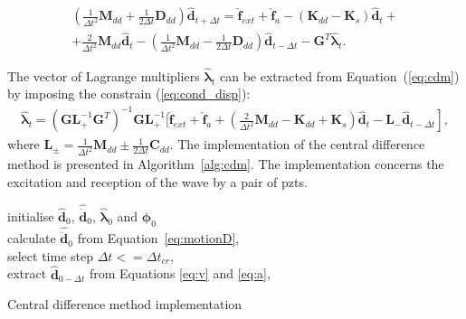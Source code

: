 \begin{equation}
	\begin{array}{c}
		\left(\frac{1}{\Delta t^2}\textbf{M}_{dd}+\frac{1}{2\Delta t}\textbf{D}_{dd} \right)\widehat{\textbf{d}}_{t+\Delta t}=
		\widehat{\textbf{f}}_{ext} + \widehat{\textbf{f}}_{a} - \left( \textbf{K}_{dd}-\textbf{K}_s\right)\widehat{\textbf{d}}_t+\\
		+\frac{2}{\Delta t^2}\textbf{M}_{dd}\widehat{\textbf{d}}_t-\left(\frac{1}{\Delta t^2}\textbf{M}_{dd}-\frac{1}{2\Delta t}\textbf{D}_{dd}\right)\widehat{\textbf{d}}_{t-\Delta t}-\textbf{G}^T\widehat{\boldsymbol{\lambda}}_t.
	\end{array}
	\label{eq:cdm}
\end{equation}

The vector of Lagrange multipliers \(\widehat{\boldsymbol{\lambda}}_t\) can be extracted from Equation~(\ref{eq:cdm}) by imposing the constrain (\ref{eq:cond_disp}): 
\begin{eqnarray}
	\widehat{\boldsymbol{\lambda}}_t = {\left(\textbf{G}\textbf{L}_+^{-1}\textbf{G}^T \right)}^{-1}\textbf{G}\textbf{L}_+^{-1} \Bigg[ \widehat{\textbf{f}}_{ext} + \widehat{\textbf{f}}_{a} + \left.\left(\frac{2}{\Delta t^2}\textbf{M}_{dd}-\textbf{K}_{dd}+\textbf{K}_s\right)\widehat{\textbf{d}}_t -\textbf{L}_-\widehat{\textbf{d}}_{t-\Delta t} \right],
	\label{eq:lambda}
\end{eqnarray}
where \(\textbf{L}_{\pm}=\frac{1}{\Delta t^2}\textbf{M}_{dd}\pm\frac{1}{2\Delta t}\textbf{C}_{dd}\).
The implementation of the central difference method is presented in Algorithm~\ref{alg:cdm}.
The implementation concerns the excitation and reception of the wave by a pair of \acp{pzt}.

\begin{algorithm}[H]
	\SetAlgoLined
	initialise  \(\widehat{\textbf{d}}_0\), \(\widehat{\dot{\textbf{d}}}_0\), \(\widehat{\boldsymbol{\lambda}}_0\) and \(\boldsymbol{\phi}_{0}\)\\
	calculate \(\widehat{\ddot{\textbf{d}}}_0\) from Equation~\ref{eq:motionD},\\
	select time step \(\Delta t<=\Delta t_{cr}\),\\
	extract \(\widehat{\textbf{d}}_{0-\Delta t}\) from Equations \ref{eq:v} and \ref{eq:a},\\
	\caption{Central difference method implementation}
	\label{alg:cdm}
\end{algorithm}

